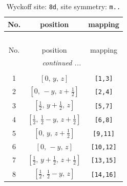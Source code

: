 \documentclass[fleqn,8pt]{jsarticle}
\begin{document}
\begin{longtable}{ccc}
\caption{Wyckoff site: {\tt 8d}, site symmetry: {\tt m..}}
 \\
 \hline \hline
No. & position & mapping \\ \hline \endfirsthead

\multicolumn{2}{l}{\tablename\ \thetable{}} \\
 \hline \hline
No. & position & mapping \\ \hline \endhead

 \hline \hline
\multicolumn{2}{r}{\footnotesize\it continued ...} \\ \endfoot

 \hline \hline
\multicolumn{2}{r}{} \\ \endlastfoot

1 & $\left[ 0,\, y,\, z \right]$ & {\tt [1,3]} \\ \hline
2 & $\left[ 0,\, - y,\, z + \frac{1}{2} \right]$ & {\tt [2,4]} \\ \hline
3 & $\left[ \frac{1}{2},\, y + \frac{1}{2},\, z \right]$ & {\tt [5,7]} \\ \hline
4 & $\left[ \frac{1}{2},\, \frac{1}{2} - y,\, z + \frac{1}{2} \right]$ & {\tt [6,8]} \\ \hline
5 & $\left[ 0,\, y,\, z + \frac{1}{2} \right]$ & {\tt [9,11]} \\ \hline
6 & $\left[ 0,\, - y,\, z \right]$ & {\tt [10,12]} \\ \hline
7 & $\left[ \frac{1}{2},\, y + \frac{1}{2},\, z + \frac{1}{2} \right]$ & {\tt [13,15]} \\ \hline
8 & $\left[ \frac{1}{2},\, \frac{1}{2} - y,\, z \right]$ & {\tt [14,16]} \\
\end{longtable}
\renewcommand{\arraystretch}{1.2}
\end{document}
